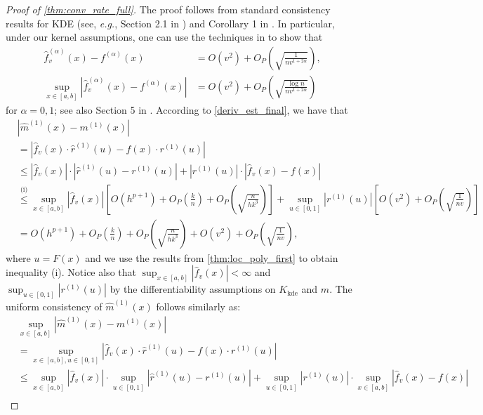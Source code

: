 \documentclass{uwstat572}
\theoremstyle{definition}
\renewcommand{\hat}{\widehat}
\theoremstyle{theorem}
\begin{document}
\begin{proof}[Proof of \autoref{thm:conv_rate_full}]
The proof follows from standard consistency results for KDE (see, \emph{e.g.}, Section 2.1 in \citealt{chen2017tutorial}) and Corollary 1 in \cite{francisco2003uniform}. In particular, under our kernel assumptions, one can use the techniques in \cite{gine2002rates,Einmahl2005uniform,chacon2011asymptotics} to show that 
\begin{align*}
\hat{f}_v^{(\alpha)}(x) - f^{(\alpha)}(x) &= O(v^2) + O_P\left(\sqrt{\frac{1}{nv^{1+2\alpha}}}\right),\\ 
\sup_{x\in [a,b]}\left|\hat{f}_v^{(\alpha)}(x) - f^{(\alpha)}(x) \right| &=O(v^2) + O_P\left(\sqrt{\frac{\log n}{nv^{1+2\alpha}}}\right)
\end{align*}
for $\alpha=0,1$; see also Section 5 in \cite{genovese2014nonparametric}. According to \eqref{deriv_est_final}, we have that
\begin{align*}
&\left|\hat{m}^{(1)}(x) - m^{(1)}(x)\right| \\
&= \left|\hat{f}_v(x) \cdot \hat{r}^{(1)}(u) - f(x)\cdot r^{(1)}(u) \right|\\
&\leq \left|\hat{f}_v(x)\right| \cdot \left|\hat{r}^{(1)}(u) -r^{(1)}(u) \right| + \left|r^{(1)}(u)\right|\cdot \left|\hat{f}_v(x) -f(x)\right|\\
& \stackrel{\text{(i)}}{\leq} \sup_{x\in [a,b]} \left|\hat{f}_v(x)\right| \left[O(h^{p+1}) + O_P\left(\frac{k}{n}\right) +O_P\left(\sqrt{\frac{n}{hk^3}}\right)\right] + \sup_{u\in [0,1]}\left|r^{(1)}(u)\right| \left[O(v^2) + O_P\left(\sqrt{\frac{1}{nv}}\right)\right]\\
&= O(h^{p+1}) + O_P\left(\frac{k}{n}\right) +O_P\left(\sqrt{\frac{n}{hk^3}}\right) + O(v^2) + O_P\left(\sqrt{\frac{1}{nv}}\right),
\end{align*}
where $u=F(x)$ and we use the results from \autoref{thm:loc_poly_first} to obtain inequality (i). Notice also that $\sup_{x\in [a,b]} \left|\hat{f}_v(x)\right| <\infty$ and $\sup_{u\in [0,1]}\left|r^{(1)}(u)\right|$ by the differentiability assumptions on $K_{\text{kde}}$ and $m$. The uniform consistency of $\hat{m}^{(1)}(x)$ follows similarly as:
\begin{align*}
&\sup_{x\in [a,b]} \left|\hat{m}^{(1)}(x) - m^{(1)}(x)\right| \\
&= \sup_{x\in [a,b], u\in [0,1]}\left|\hat{f}_v(x) \cdot \hat{r}^{(1)}(u) - f(x)\cdot r^{(1)}(u) \right|\\
&\leq \sup_{x\in [a,b]}\left|\hat{f}_v(x)\right| \cdot \sup_{u\in [0,1]}\left|\hat{r}^{(1)}(u) -r^{(1)}(u) \right| + \sup_{u\in [0,1]}\left|r^{(1)}(u)\right|\cdot \sup_{x\in [a,b]}\left|\hat{f}_v(x) -f(x)\right|\\

\end{align*}
\end{proof}
\end{document}
